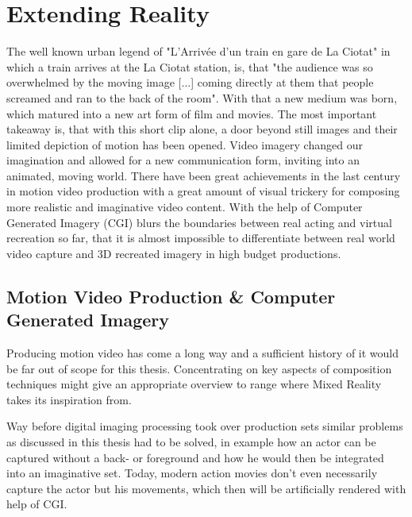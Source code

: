 %
\chapter{Extending Reality}
\label{sec:extendingreality}


The well known urban legend of "L'Arriv\'ee d'un train en gare de La Ciotat" in 
which a train arrives at the La Ciotat station, is, that "the audience was so 
overwhelmed by the moving image [...] coming directly at them that people 
screamed and ran to the back of the room". \cite{wiki:train:2017} With that a 
new medium was born, which matured into a new art form of film and movies.
\newline
The most important takeaway is, that with this short clip alone, a door beyond 
still images and their limited depiction of motion has been opened. Video 
imagery changed our imagination and allowed for a new communication form, 
inviting into an animated, moving world. There have been great achievements in 
the last century in motion video production with a great amount of visual 
trickery for composing more realistic and imaginative video content. With the 
help of Computer Generated Imagery (CGI) blurs the boundaries between real 
acting and virtual recreation so far, that it is almost impossible to 
differentiate between real world video capture and 3D recreated imagery in high 
budget productions.

\section{Motion Video Production \& Computer Generated Imagery}

Producing motion video has come a long way and a sufficient history of it would 
be far out of scope for this thesis. Concentrating on key aspects of 
composition techniques might give an appropriate overview to range where Mixed 
Reality takes its inspiration from.

Way before digital imaging processing took over production sets similar 
problems as discussed in this thesis had to be solved, in example how an actor 
can be captured without a back- or foreground and how he would then be 
integrated into an imaginative set. Today, modern action movies don't even 
necessarily capture the actor but his movements, which then will be 
artificially rendered with help of CGI.

